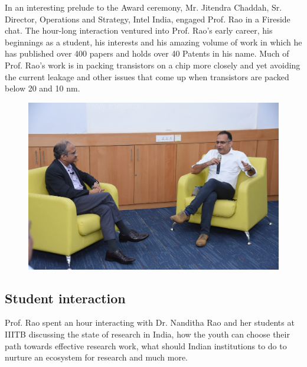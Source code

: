 \begin{multicols}{2}
In an interesting prelude to the Award ceremony, Mr. Jitendra Chaddah, Sr. Director, Operations and Strategy, Intel India, engaged Prof. Rao in a Fireside chat. The hour-long interaction ventured into Prof. Rao’s early career, his beginnings as a student, his interests and his amazing volume of work in which he has published over 400 papers and holds over 40 Patents in his name. Much of Prof. Rao’s work is in packing transistors on a chip more closely and yet avoiding the current leakage and other issues that come up when transistors are packed below 20 and 10 nm.

\begin{figure}[H]
\centering
\includegraphics[scale=.9]{src/Figures/events/event-fig04.jpg}
\vspace{-2ex}
\end{figure}

\vspace{-.5cm}

\noindent
\subsection*{Student interaction}

Prof. Rao spent an hour interacting with Dr. Nanditha Rao and her students at IIITB discussing the state of research in India, how the youth can choose their path towards effective research work, what should Indian institutions to do to nurture an ecosystem for research and much more. 


\end{multicols}
